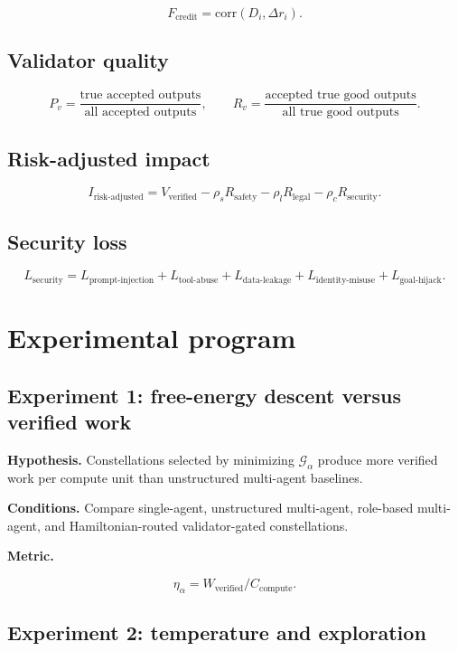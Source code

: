 \documentclass[
  11pt,
]{article}
\begin{document}
\[
F_{\text{credit}}=\text{corr}(D_i,\Delta r_i).
\]

\subsection{Validator quality}\label{validator-quality}

\[
P_v=\frac{\text{true accepted outputs}}{\text{all accepted outputs}},
\qquad
R_v=\frac{\text{accepted true good outputs}}{\text{all true good outputs}}.
\]

\subsection{Risk-adjusted impact}\label{risk-adjusted-impact}

\[
I_{\text{risk-adjusted}}=V_{\text{verified}}-\rho_sR_{\text{safety}}-\rho_lR_{\text{legal}}-\rho_cR_{\text{security}}.
\]

\subsection{Security loss}\label{security-loss}

\[
L_{\text{security}}=
L_{\text{prompt-injection}}+
L_{\text{tool-abuse}}+
L_{\text{data-leakage}}+
L_{\text{identity-misuse}}+
L_{\text{goal-hijack}}.
\]

\section{Experimental program}\label{experimental-program}

\subsection{Experiment 1: free-energy descent versus verified
work}\label{experiment-1-free-energy-descent-versus-verified-work}

\textbf{Hypothesis.} Constellations selected by minimizing
\(\mathcal{G}_{\alpha}\) produce more verified work per compute unit
than unstructured multi-agent baselines.

\textbf{Conditions.} Compare single-agent, unstructured multi-agent,
role-based multi-agent, and Hamiltonian-routed validator-gated
constellations.

\textbf{Metric.}

\[
\eta_{\alpha}=W_{\text{verified}}/C_{\text{compute}}.
\]

\subsection{Experiment 2: temperature and
exploration}\label{experiment-2-temperature-and-exploration}
\end{document}
